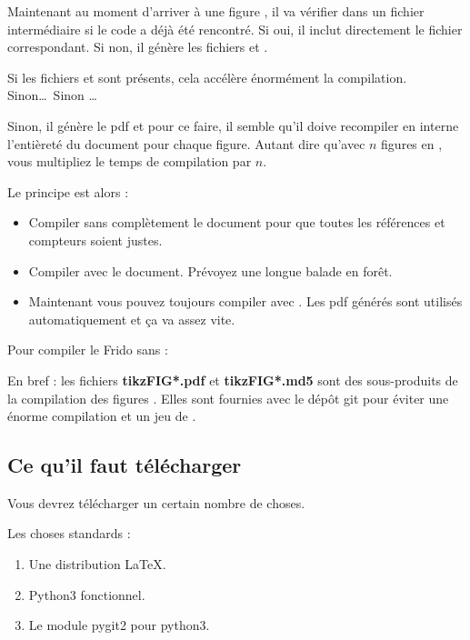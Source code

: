 Maintenant au moment d'arriver à une figure \TikZ{}, il va vérifier dans un fichier intermédiaire  si le code \TikZ{} a déjà été rencontré. Si oui, il inclut directement le fichier  correspondant. Si non, il génère les fichiers  et .

Si les fichiers  et  sont présents, cela accélère énormément la compilation. Sinon\ldots\ Sinon \ldots

Sinon, il génère le pdf et pour ce faire, il semble qu'il doive recompiler en interne l'entièreté du document pour chaque figure. Autant dire qu'avec \( n\) figures en \TikZ{}, vous multipliez le temps de compilation par \( n\).

Le principe est alors :
\begin{itemize}
    \item Compiler sans  complètement le document pour que toutes les références et compteurs soient justes.
    \item Compiler avec  le document. Prévoyez une longue balade en forêt.
    \item Maintenant vous pouvez toujours compiler avec . Les pdf générés sont utilisés automatiquement et ça va assez vite.
\end{itemize}

Pour compiler le Frido sans  :


En bref : les fichiers {\bf tikzFIG*.pdf} et {\bf tikzFIG*.md5} sont des sous-produits de la compilation des figures \TikZ{}. Elles sont fournies avec le dépôt git pour éviter une énorme compilation et un jeu de .

\subsection{Ce qu'il faut télécharger}

Vous devrez télécharger un certain nombre de choses. 

Les choses standards :
\begin{enumerate}
    \item
        Une distribution \LaTeX{}.
    \item
        Python3 fonctionnel.
    \item
        Le module pygit2 pour python3.
\end{enumerate}

